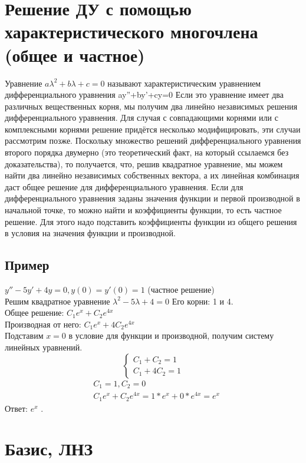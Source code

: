 \documentclass[12pt]{article}
\begin{document}
\section{ Решение ДУ с помощью характеристического многочлена (общее и частное)}
Уравнение $a\lambda^2+b\lambda+c=0$ называют характеристическим уравнением дифференциального уравнения ay''+by'+cy=0 Если это уравнение имеет два различных вещественных корня, мы получим
два линейно независимых решения дифференциального уравнения. Для случая с совпадающими корнями
или с комплексными корнями решение придётся несколько модифицировать, эти случаи рассмотрим позже.
Поскольку множество решений дифференциального уравнения второго порядка двумерно (это
теоретический факт, на который ссылаемся без доказательства), то получается, что, решив квадратное
уравнение, мы можем найти два линейно независимых собственных вектора, а их линейная комбинация
даст общее решение для дифференциального уравнения.
Если для дифференциального уравнения заданы значения функции и первой производной в начальной
точке, то можно найти и коэффициенты функции, то есть частное решение. Для этого надо подставить
коэффициенты функции из общего решения в условия на значения функции и производной.

\subsection{Пример}
$y''-5y'+4y=0, y(0)=y'(0) = 1$ (частное решение)
\\
Решим квадратное уравнение $\lambda^2-5\lambda+4=0$
Его корни: 1 и 4.
\\
Общее решение: $C_1e^x+C_2e^{4x}$
\\
Производная от него:  $C_1e^x+4C_2e^{4x}$
\\
Подставим $x = 0$ в условие для функции и производной, получим систему линейных уравнений.
\[
    \begin{cases}
        C_1+C_2=1 \\
        C_1+4C_2=1
    \end{cases}
\]
\begin{align*}
     & C_1 = 1, C_2 = 0                        \\
     & C_1e^x+C_2e^{4x} = 1*e^x+0*e^{4x} = e^x
\end{align*}
Ответ: $e^x$ .

\setcounter{section}{32}
\section{Базис, ЛНЗ}
\end{document}
